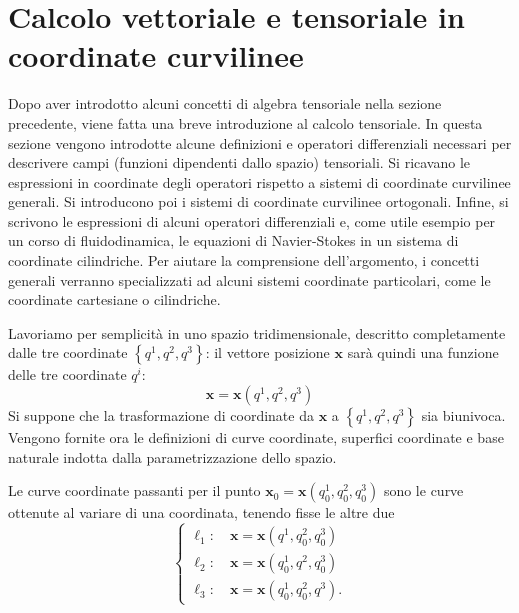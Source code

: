 \section{Calcolo vettoriale e tensoriale in coordinate curvilinee}

Dopo aver introdotto alcuni concetti di algebra tensoriale nella sezione precedente, viene fatta una breve introduzione al calcolo tensoriale. In questa sezione vengono introdotte alcune definizioni e operatori differenziali necessari per descrivere campi (funzioni dipendenti dallo spazio) tensoriali. Si ricavano le espressioni in coordinate degli operatori rispetto a sistemi di coordinate curvilinee generali. Si introducono poi i sistemi di coordinate curvilinee ortogonali. Infine, si scrivono le espressioni di alcuni operatori differenziali e, come utile esempio per un corso di fluidodinamica, le equazioni di Navier-Stokes in un sistema di coordinate cilindriche.
Per aiutare la comprensione dell'argomento, i concetti generali verranno specializzati ad alcuni sistemi coordinate particolari, come le coordinate cartesiane o cilindriche.

Lavoriamo per semplicità in uno spazio tridimensionale, descritto completamente
 dalle tre coordinate $\left\{q^1, q^2, q^3\right\}$: il vettore posizione $\bm{x}$ sarà quindi una funzione
 delle tre coordinate $q^i$:
 \begin{equation}
  \bm{x} = \bm{x}(q^1, q^2, q^3)
 \end{equation}
 Si suppone che la trasformazione di coordinate da $\bm{x}$ a $\left\{q^1, q^2, q^3\right\}$ sia biunivoca. Vengono fornite ora le definizioni di curve coordinate, superfici coordinate e base naturale indotta dalla parametrizzazione dello spazio.

\begin{definition}
 Le curve coordinate passanti per il punto $\bm{x}_0=\bm{x}(q_0^1, q_0^2, q_0^3)$ sono le curve ottenute al variare di una coordinata, tenendo fisse le altre due
 \begin{equation}
 \begin{cases}
  \ell_1 : \quad \bm{x} = \bm{x}(q^1, q_0^2, q_0^3) \\
  \ell_2 : \quad \bm{x} = \bm{x}(q_0^1, q^2, q_0^3) \\
  \ell_3 : \quad \bm{x} = \bm{x}(q_0^1, q_0^2, q^3) .
 \end{cases}
 \end{equation}
\end{definition}
 
